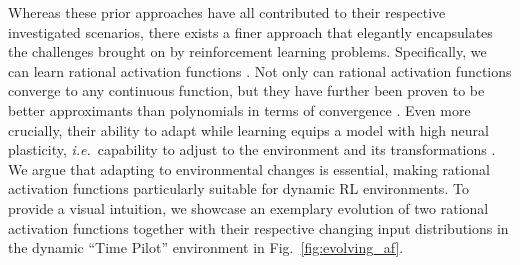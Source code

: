 \documentclass[accepted]{article}
\theoremstyle{plain}
\theoremstyle{definition}
\theoremstyle{remark}
\newcommand{\ie}{\emph{i.e.}~}
\begin{document}
Whereas these prior approaches have all contributed to their respective investigated scenarios, there exists a finer approach that elegantly encapsulates the challenges brought on by reinforcement learning problems. Specifically, we can learn rational activation functions \citep{molina2019pad}. Not only can rational activation functions converge to any continuous function, but they have further been proven to be better approximants than polynomials in terms of convergence \citep{telgarsky2017neural}. Even more crucially, their ability to adapt while learning equips a model with high neural plasticity, \ie capability to adjust to the environment and its transformations \citep{Garlick2002UnderstandingTN}.
We argue that adapting to environmental changes is essential, making rational activation functions particularly suitable for dynamic RL environments. 
To provide a visual intuition, we showcase an exemplary evolution of two rational activation functions together with their respective changing input distributions in the dynamic ``Time Pilot'' environment in Fig.~\ref{fig:evolving_af}.
\end{document}
